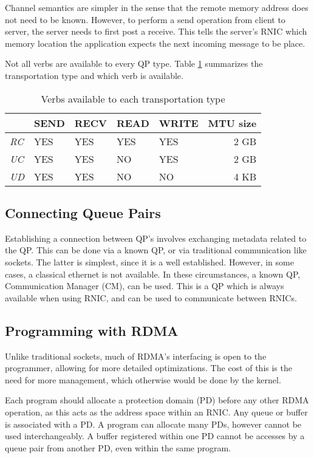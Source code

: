 Channel semantics are simpler in the sense that the remote memory address does not need to be known.
However, to perform a send operation from client to server, the server needs to first post a receive.
This tells the server's RNIC which memory location the application expects the next incoming message to be place.

Not all verbs are available to every QP type. Table \ref{tab:transport-verb} summarizes the transportation type and which verb is available.
\begin{table}
    \centering
    \begin{tabular}{lllllr}
        \toprule
          & \textbf{SEND} & \textbf{RECV} & \textbf{READ} & \textbf{WRITE} & \textbf{MTU size} \\
        \midrule
        \textit{RC} & YES & YES & YES & YES & 2 GB \\
        \textit{UC} & YES & YES & NO & YES & 2 GB \\
        \textit{UD} & YES & YES & NO & NO & 4 KB \\
        \bottomrule
    \end{tabular}
    \caption{Verbs available to each transportation type}
    \label{tab:transport-verb}
\end{table}

\subsection{Connecting Queue Pairs}\label{subsec:connecting-qp's}
Establishing a connection between QP's involves exchanging metadata related to the QP.
This can be done via a known QP, or via traditional communication like sockets.
The latter is simplest, since it is a well established.
However, in some cases, a classical ethernet is not available.
In these circumstances, a known QP, Communication Manager (CM), can be used.
This is a QP which is always available when using RNIC, and can be used to communicate between RNICs.

\subsection{Programming with RDMA}\label{subsec:programming-with-rdma}
Unlike traditional sockets, much of RDMA's interfacing is open to the programmer, allowing for more detailed optimizations.
The cost of this is the need for more management, which otherwise would be done by the kernel.

Each program should allocate a protection domain (PD) before any other RDMA operation, as this acts as the address space within an RNIC.
Any queue or buffer is associated with a PD.
A program can allocate many PDs, however cannot be used interchangeably.
A buffer registered within one PD cannot be accesses by a queue pair from another PD, even within the same program.

